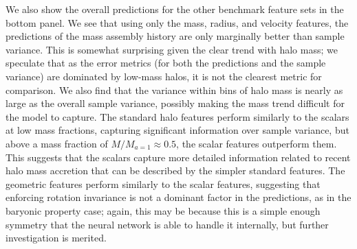 We also show the overall predictions for the other benchmark feature sets in the bottom panel.
We see that using only the mass, radius, and velocity features, the predictions of the mass assembly history are only marginally better than sample variance.
This is somewhat surprising given the clear trend with halo mass; we speculate that as the error metrics (for both the predictions and the sample variance) are dominated by low-mass halos, it is not the clearest metric for comparison.
We also find that the variance within bins of halo mass is nearly as large as the overall sample variance, possibly making the mass trend difficult for the model to capture.
The standard halo features perform similarly to the scalars at low mass fractions, capturing significant information over sample variance, but above a mass fraction of $M/M_{a=1} \approx 0.5$, the scalar features outperform them.
This suggests that the scalars capture more detailed information related to recent halo mass accretion that can be described by the simpler standard features.
The geometric features perform similarly to the scalar features, suggesting that enforcing rotation invariance is not a dominant factor in the predictions, as in the baryonic property case; again, this may be because this is a simple enough symmetry that the neural network is able to handle it internally, but further investigation is merited.

